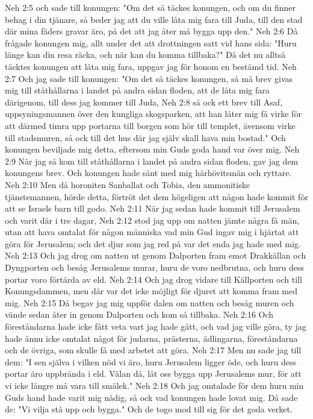 Neh 2:5  och sade till konungen: "Om det så täckes konungen, och om du finner behag i din tjänare, så beder jag att du ville låta mig fara till Juda, till den stad där mina fäders gravar äro, på det att jag åter må bygga upp den."
Neh 2:6  Då frågade konungen mig, allt under det att drottningen satt vid hans sida: "Huru länge kan din resa räcka, och när kan du komma tillbaka?" Då det nu alltså täcktes konungen att låta mig fara, uppgav jag för honom en bestämd tid.
Neh 2:7  Och jag sade till konungen: "Om det så täckes konungen, så må brev givas mig till ståthållarna i landet på andra sidan floden, att de låta mig fara därigenom, till dess jag kommer till Juda,
Neh 2:8  så ock ett brev till Asaf, uppsyningsmannen över den kungliga skogsparken, att han låter mig få virke för att därmed timra upp portarna till borgen som hör till templet, ävensom virke till stadsmuren, så ock till det hus där jag själv skall hava min bostad." Och konungen beviljade mig detta, eftersom min Guds goda hand var över mig.
Neh 2:9  När jag så kom till ståthållarna i landet på andra sidan floden, gav jag dem konungens brev. Och konungen hade sänt med mig härhövitsmän och ryttare.
Neh 2:10  Men då horoniten Sanballat och Tobia, den ammonitiske tjänstemannen, hörde detta, förtröt det dem högeligen att någon hade kommit för att se Israels barn till godo.
Neh 2:11  När jag sedan hade kommit till Jerusalem och varit där i tre dagar,
Neh 2:12  stod jag upp om natten jämte några få män, utan att hava omtalat för någon människa vad min Gud ingav mig i hjärtat att göra för Jerusalem; och det djur som jag red på var det enda jag hade med mig.
Neh 2:13  Och jag drog om natten ut genom Dalporten fram emot Drakkällan och Dyngporten och besåg Jerusalems murar, huru de voro nedbrutna, och huru dess portar voro förtärda av eld.
Neh 2:14  Och jag drog vidare till Källporten och till Konungsdammen, men där var det icke möjligt för djuret att komma fram med mig.
Neh 2:15  Då begav jag mig uppför dalen om natten och besåg muren och vände sedan åter in genom Dalporten och kom så tillbaka.
Neh 2:16  Och föreståndarna hade icke fått veta vart jag hade gått, och vad jag ville göra, ty jag hade ännu icke omtalat något för judarna, prästerna, ädlingarna, föreståndarna och de övriga, som skulle få med arbetet att göra.
Neh 2:17  Men nu sade jag till dem: "I sen själva i vilken nöd vi äro, huru Jerusalem ligger öde, och huru dess portar äro uppbrända i eld. Välan då, låt oss bygga upp Jerusalems mur, för att vi icke längre må vara till smälek."
Neh 2:18  Och jag omtalade för dem huru min Guds hand hade varit mig nådig, så ock vad konungen hade lovat mig. Då sade de: "Vi vilja stå upp och bygga." Och de togo mod till sig för det goda verket.
